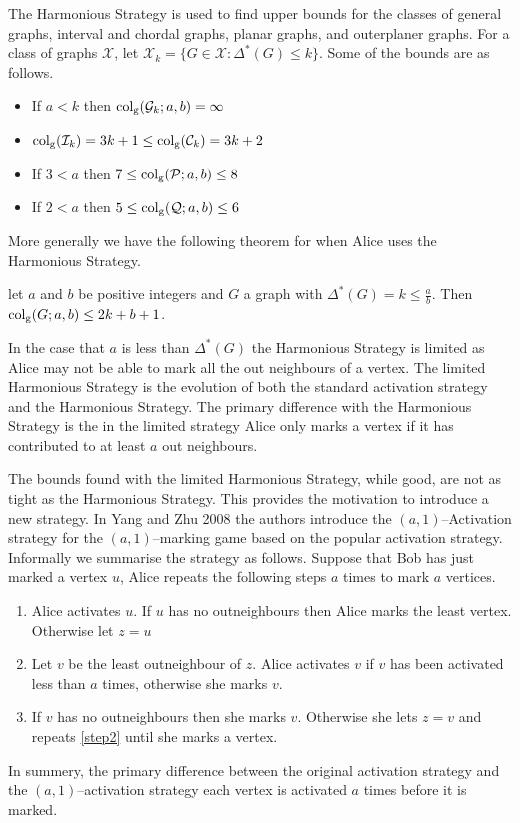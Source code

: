 The Harmonious Strategy is used to find upper bounds for the classes of general graphs, interval and chordal graphs, planar graphs, and outerplaner graphs. For a class of graphs $\mathcal{X}$, let $\mathcal{X}_k= \{G\in\mathcal{X}: \Delta^*(G)\leq k\}$. Some of the bounds are as follows.    
\begin{itemize}
    \item If $a < k$ then $\operatorname{col_g}(\mathcal{G}_k;a,b)=\infty$
    \item $\operatorname{col_g}(\mathcal{I}_k)=3k+1\leq\operatorname{col_g}(\mathcal{C}_k)=3k+2$
    \item If $3<a $ then $7\leq \operatorname{col_g}(\mathcal{P};a,b)\leq 8$
    \item If $2< a$ then $5\leq \operatorname{col_g}(\mathcal{Q};a,b)\leq 6$
\end{itemize}
More generally we have the following theorem for when Alice uses the Harmonious Strategy.
\begin{theorem}
    let $a$ and $b$ be positive integers and $G$ a graph with $\Delta^*(G)=k\leq\frac{a}{b}$. Then $\operatorname{col_g}(G;a,b)\leq 2k+b+1$.
\end{theorem}

In the case that $a$ is less than $\Delta^*(G)$ the Harmonious Strategy is limited as Alice may not be able to mark all the out neighbours of a vertex. The limited Harmonious Strategy is the evolution of both the standard activation strategy and the Harmonious Strategy. The primary difference with the Harmonious Strategy is the in the limited strategy Alice only marks a vertex if it has contributed to at least $a$ out neighbours.    

The bounds found with the limited Harmonious Strategy, while good, are not as tight as the Harmonious Strategy. This provides the motivation to introduce a new strategy. In Yang and Zhu 2008 \cite{yangZhu2008} the authors introduce the $(a,1)$--Activation strategy for the $(a,1)$--marking game based on the popular activation strategy. Informally we summarise the strategy as follows. Suppose that Bob has just marked a vertex $u$, Alice repeats the following steps $a$ times to mark $a$ vertices.
\begin{enumerate}
    \item Alice activates $u$. If $u$ has no outneighbours then Alice marks the least vertex. Otherwise let $z=u$
    
    \item Let $v$ be the least outneighbour of $z$. Alice activates $v$ if $v$ has been activated less than $a$ times, otherwise she marks $v$. \label{step2}
    
    \item If $v$ has no outneighbours then she marks $v$. Otherwise she lets $z=v$ and repeats \ref{step2} until she marks a vertex.     
\end{enumerate}
In summery, the primary difference between the original activation strategy and the $(a,1)$--activation strategy each vertex is activated $a$ times before it is marked.

